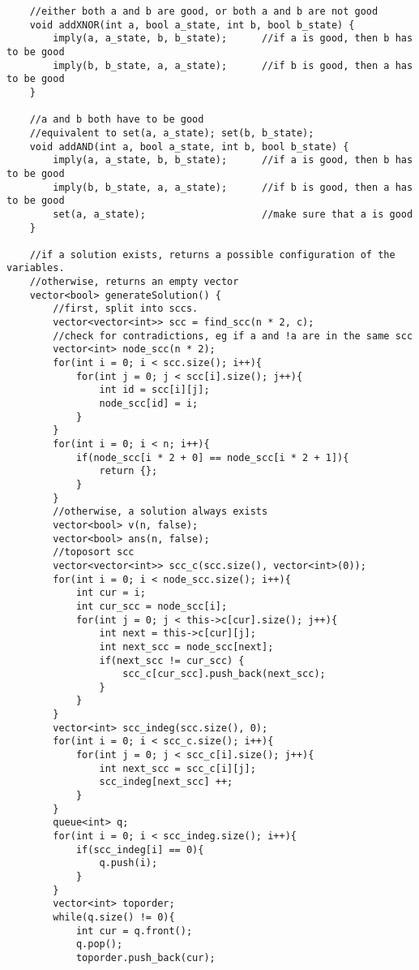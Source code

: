 \documentclass[8pt, headheight=10pt, a4paper]{article}
\begin{document}
\begin{multicols*}{3}
\begin{lstlisting}
    //either both a and b are good, or both a and b are not good
    void addXNOR(int a, bool a_state, int b, bool b_state) {
        imply(a, a_state, b, b_state);      //if a is good, then b has to be good
        imply(b, b_state, a, a_state);      //if b is good, then a has to be good
    }

    //a and b both have to be good
    //equivalent to set(a, a_state); set(b, b_state);
    void addAND(int a, bool a_state, int b, bool b_state) {
        imply(a, a_state, b, b_state);      //if a is good, then b has to be good
        imply(b, b_state, a, a_state);      //if b is good, then a has to be good
        set(a, a_state);                    //make sure that a is good
    }

    //if a solution exists, returns a possible configuration of the variables. 
    //otherwise, returns an empty vector
    vector<bool> generateSolution() {
        //first, split into sccs. 
        vector<vector<int>> scc = find_scc(n * 2, c);
        //check for contradictions, eg if a and !a are in the same scc
        vector<int> node_scc(n * 2);
        for(int i = 0; i < scc.size(); i++){
            for(int j = 0; j < scc[i].size(); j++){
                int id = scc[i][j];
                node_scc[id] = i;
            }
        }
        for(int i = 0; i < n; i++){
            if(node_scc[i * 2 + 0] == node_scc[i * 2 + 1]){
                return {};
            }
        }
        //otherwise, a solution always exists
        vector<bool> v(n, false);
        vector<bool> ans(n, false);
        //toposort scc
        vector<vector<int>> scc_c(scc.size(), vector<int>(0));
        for(int i = 0; i < node_scc.size(); i++){
            int cur = i;
            int cur_scc = node_scc[i];
            for(int j = 0; j < this->c[cur].size(); j++){
                int next = this->c[cur][j];
                int next_scc = node_scc[next];
                if(next_scc != cur_scc) {
                    scc_c[cur_scc].push_back(next_scc);
                }
            }
        }
        vector<int> scc_indeg(scc.size(), 0);
        for(int i = 0; i < scc_c.size(); i++){
            for(int j = 0; j < scc_c[i].size(); j++){
                int next_scc = scc_c[i][j];
                scc_indeg[next_scc] ++;
            }
        }
        queue<int> q;
        for(int i = 0; i < scc_indeg.size(); i++){
            if(scc_indeg[i] == 0){
                q.push(i);
            }
        }
        vector<int> toporder;
        while(q.size() != 0){
            int cur = q.front();
            q.pop();
            toporder.push_back(cur);

\end{lstlisting}
\end{multicols*}
\end{document}
